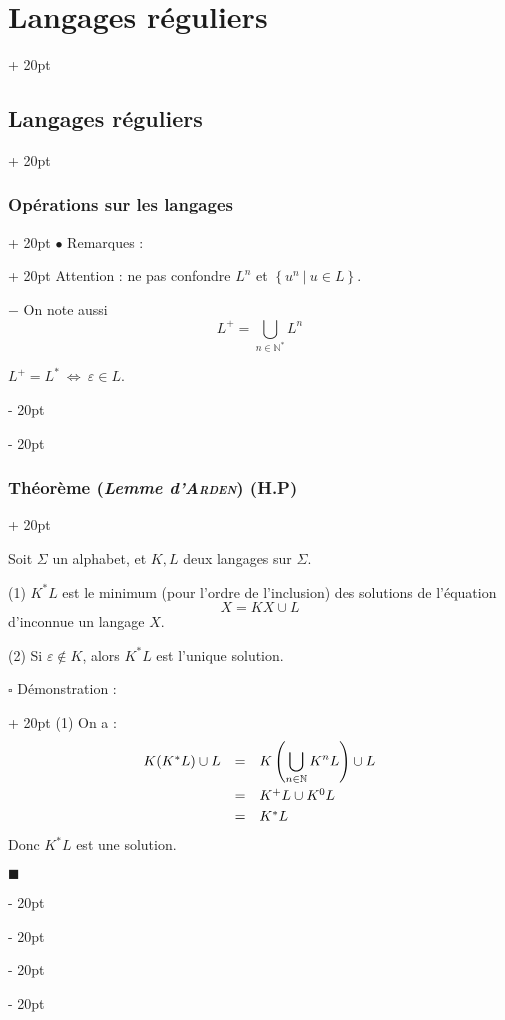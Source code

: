 \documentclass[a4paper, 12pt, twoside]{article}
\newcommand{\N}{\mathbb{N}} %
\newcommand{\lr}[1]{\left( #1 \right)}
\newcommand{\set}[1]{\left\{ #1 \right\}}
\newcommand{\ssi}{\ \Leftrightarrow \ }
\newcommand{\ind}[1][20pt]{\advance\leftskip + #1}
\newcommand{\deind}[1][20pt]{\advance\leftskip - #1}
\newenvironment{indt}[2][20pt]{#2 \par \ind[#1]}{\par \deind} %
\newenvironment{proof}[1][{Démonstration :}]{\begin{indt}{$\square$ #1}}{$\blacksquare$ \end{indt}}
\begin{document}
\begin{indt}{\section{Langages réguliers}}
\begin{indt}{\subsection{Langages réguliers}}
\begin{indt}{\subsubsection{Opérations sur les langages}}
\begin{indt}{$\bullet$ Remarques :}
                    Attention : ne pas confondre $L^n$ et $\set{u^n\ |\ u \in L}$.

                    $-$ On note aussi
                    \[
                        L^+ = \bigcup_{n \in \N^*} L^n
                    \]

                    \vspace{6pt}
                    
                     $L^+ = L^* \ssi \varepsilon \in L$.
                \end{indt}
            \end{indt}

            \vspace{12pt}
            
            \begin{indt}{\subsubsection{Théorème (\textit{Lemme d'\textsc{Arden}}) (H.P)}}
                \begin{emphBox}
                    Soit $\Sigma$ un alphabet, et $K, L$ deux langages sur $\Sigma$.

                    (1) $K^* L$ est le minimum (pour l'ordre de l'inclusion) des solutions de l'équation
                    \[
                        X = K X \cup L
                    \]
                    d'inconnue un langage $X$.

                    \vspace{6pt}
                    
                    (2) Si $\varepsilon \notin K$, alors $K^* L$ est l'unique solution.
                \end{emphBox}

                \vspace{12pt}
                
                \begin{proof}
                    (1) On a :
                    \[
                        \begin{array}{rcl}
                            K(K^*L)\cup L
                            &=& \displaystyle K\lr{\bigcup_{n \in \N} K^n L} \cup L
                            \vspace{3pt}
                            \\
                            &=& K^+ L \cup K^0 L
                            \vspace{3pt}
                            \\
                            &=&K^* L
                        \end{array}
                    \]
                    Donc $K^*L$ est une solution.


\end{proof}
\end{indt}
\end{indt}
\end{indt}
\end{document}
